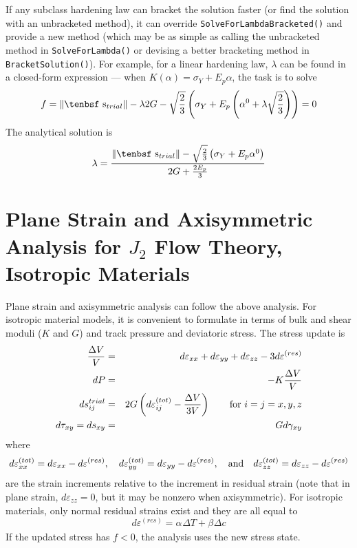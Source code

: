 \documentclass[11pt]{book}
\def\a#1{\alpha_{#1}}
\def\b#1{\beta_{#1}}
\def\dev{\hbox{\tenbsf s}}
\def\DT{\Delta T}
\def\er#1{\varepsilon_{#1}^{(res)}}
\begin{document}
If any subclass hardening law can bracket the solution faster (or find the solution with an unbracketed method), it can override {\tt SolveForLambdaBracketed()} and provide a new method (which may be as simple as calling the unbracketed method in {\tt SolveForLambda()} or devising a better bracketing method in {\tt BracketSolution()}). For example, for a linear hardening law, $\lambda$ can be found in a closed-form expression --- when $K(\alpha)=\sigma_Y + E_p\alpha$, the task is to solve
\begin{equation}
      f =  \|\dev_{trial}\| - \lambda 2G -  \sqrt{2\over3} \left(\sigma_Y + E_p\left(\alpha^{0}+ \lambda \sqrt{2\over3}\right)\right) = 0
\end{equation}
The analytical solution is
\begin{equation}
      \lambda = { \|\dev_{trial}\| - \sqrt{2\over3}\left(\sigma_Y + E_p\alpha^{0} \right) \over  2G +  {2E_p\over3} }
\end{equation}

\section{Plane Strain and Axisymmetric Analysis for $J_2$ Flow Theory, Isotropic Materials}

Plane strain and axisymmetric analysis can follow the above analysis. For isotropic material models, it is convenient to formulate in terms of bulk and shear moduli ($K$ and $G$) and track pressure and deviatoric stress. The stress update is
\begin{eqnarray}
       {\Delta V\over V} & = & d\varepsilon_{xx} + d\varepsilon_{yy} + d\varepsilon_{zz}  - 3d\er{} \\
       dP & = & -K {\Delta V\over V} \\
       ds_{ij}^{trial} & = & 2G \left(d\varepsilon_{ij}^{(tot)} - {\Delta V\over 3V}\right)   \qquad {\rm for\ }i=j=x,y,z\\
       d\tau_{xy} = ds_{xy} & = & G d\gamma_{xy} \\
\end{eqnarray}
where
\begin{equation}
      d\varepsilon_{xx}^{(tot)} = d\varepsilon_{xx} - d\er{}, \quad
      d\varepsilon_{yy}^{(tot)} = d\varepsilon_{yy} - d\er{}, \quad {\rm and}\quad
      d\varepsilon_{zz}^{(tot)} =  d\varepsilon_{zz} - d\er{}
\end{equation}
are the strain increments relative to the increment in residual strain (note that in plane strain, $ d\varepsilon_{zz}=0$, but it may be nonzero when axisymmetric). For isotropic materials, only normal residual strains exist and they are all equal to
\begin{equation}
      d\er{} = \a{}\DT + \b{}\Delta c
\end{equation}
If the updated stress has $f<0$, the analysis uses the new stress state.
\end{document}
